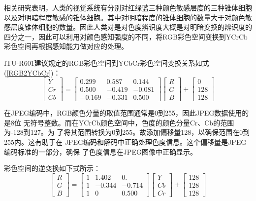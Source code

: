 \documentclass{article}
\numberwithin {equation}{section}
\begin{document}
\begin{spacing}{1.25}
    相关研究表明，人类的视觉系统有分别对红绿蓝三种颜色敏感层度的三种锥体细胞
    以及对明暗程度敏感的锥体细胞。其中对明暗程度的锥体细胞的数量大于对颜色敏
    感层度锥体细胞的数量。因此人类对是对色度辨识度大概是对明暗变换的辨识度的
    四分之一，因此可以利用对颜色感知强度的不同，将RGB彩色空间变换到YCrCb
    \cite{rao2014discrete}彩色空间再根据感知能力做对应的处理。

    ITU-R601建议规定的RGB彩色空间到YCbCr彩色空间变换关系如式(\ref{RGB2YCbCr})：
    \begin{equation}
      \begin{bmatrix}Y\\ Cr\\ Cb\end{bmatrix}=
      \begin{bmatrix}
        0.299 & 0.587 & 0.144\\
        0.500 & -0.419 & -0.081\\
        -0.169 & -0.331 & 0.500
      \end{bmatrix}
      \begin{bmatrix}R\\ G\\ B\end{bmatrix}+
      \begin{bmatrix}0\\ 128\\ 128\end{bmatrix}
      \label{RGB2YCbCr}
    \end{equation}

    在JPEG编码中，RGB颜色分量的取值范围通常是0到255，因此JPEG数据使用的是8位
    无符号整数。而在YCrCb颜色空间中，色度的颜色分量Cr、Cb的范围为-128到127。为
    了将其范围转换为0到255。故添加偏移量128，以确保范围在0到255内。这有助于在
    JPEG编码和解码中正确处理色度信息。这个偏移量是JPEG编码标准的一部分，确保
    了色度信息在JPEG图像中正确显示。

    彩色空间的逆变换如下式所示：
    \begin{equation}
      \begin{bmatrix}R\\ G\\ B\end{bmatrix}=
      \begin{bmatrix}
        1 & 1.402 & 0.\\
        1 & -0.344 & -0.714\\
        1 & 0 & 0.500
      \end{bmatrix}
      \begin{bmatrix}Y\\ Cb\\ Cr\end{bmatrix}+
      \begin{bmatrix}128\\ 128\\ 128\end{bmatrix}
      \label{YCbCr2RGB}
    \end{equation}


\end{spacing}
\end{document}
